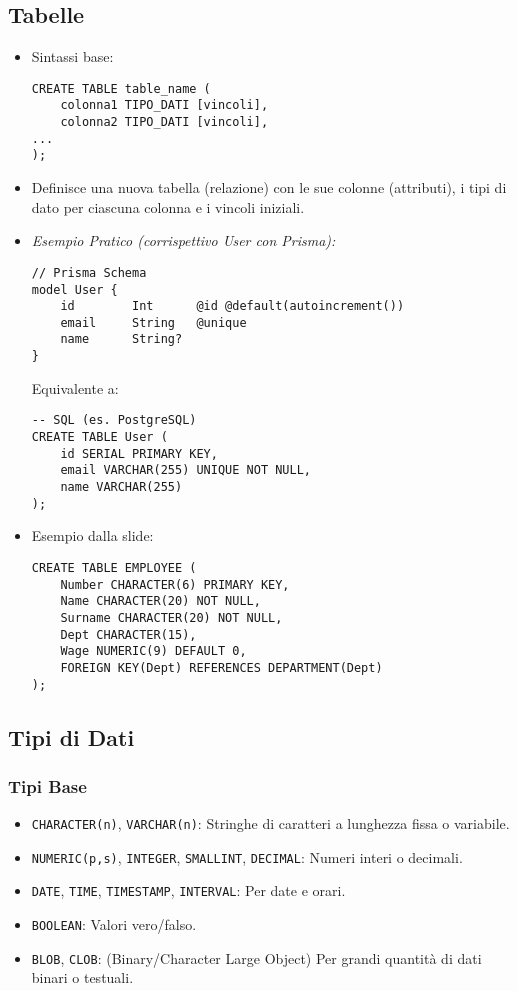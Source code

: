 	\subsection{Tabelle}
	\begin{itemize}
		\item Sintassi base:
		\begin{verbatim}
CREATE TABLE table_name (
	colonna1 TIPO_DATI [vincoli],
	colonna2 TIPO_DATI [vincoli],
...
);
		\end{verbatim}
		\item Definisce una nuova tabella (relazione) con le sue colonne (attributi), i tipi di dato per ciascuna colonna e i vincoli iniziali.
		\item \textit{Esempio Pratico (corrispettivo User con Prisma):}
		\begin{verbatim}
// Prisma Schema
model User {
	id        Int      @id @default(autoincrement())
	email     String   @unique
	name      String?
}
		\end{verbatim}
		Equivalente a:
		\begin{verbatim}
-- SQL (es. PostgreSQL)
CREATE TABLE User (
	id SERIAL PRIMARY KEY,
	email VARCHAR(255) UNIQUE NOT NULL,
	name VARCHAR(255)
);
		\end{verbatim}
		\item Esempio dalla slide:
		\begin{verbatim}
CREATE TABLE EMPLOYEE (
	Number CHARACTER(6) PRIMARY KEY,
	Name CHARACTER(20) NOT NULL,
	Surname CHARACTER(20) NOT NULL,
	Dept CHARACTER(15),
	Wage NUMERIC(9) DEFAULT 0,
	FOREIGN KEY(Dept) REFERENCES DEPARTMENT(Dept)
);
		\end{verbatim}
	\end{itemize}
	
	\subsection{Tipi di Dati}
	\subsubsection{Tipi Base}
	\begin{itemize}
		\item \texttt{CHARACTER(n)}, \texttt{VARCHAR(n)}: Stringhe di caratteri a lunghezza fissa o variabile.
		\item \texttt{NUMERIC(p,s)}, \texttt{INTEGER}, \texttt{SMALLINT}, \texttt{DECIMAL}: Numeri interi o decimali.
		\item \texttt{DATE}, \texttt{TIME}, \texttt{TIMESTAMP}, \texttt{INTERVAL}: Per date e orari.
		\item \texttt{BOOLEAN}: Valori vero/falso.
		\item \texttt{BLOB}, \texttt{CLOB}: (Binary/Character Large Object) Per grandi quantità di dati binari o testuali.
	\end{itemize}
